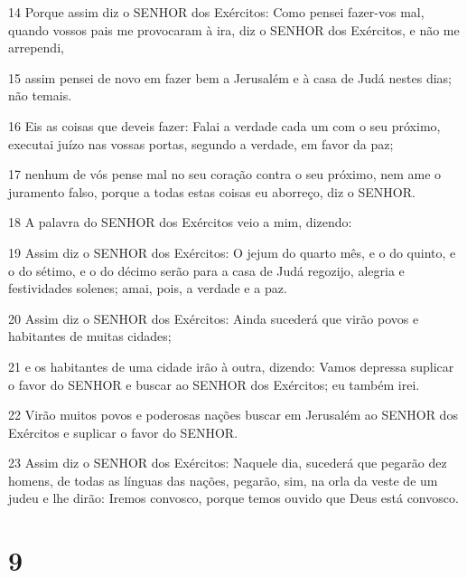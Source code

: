 \par 14 Porque assim diz o SENHOR dos Exércitos: Como pensei fazer-vos mal, quando vossos pais me provocaram à ira, diz o SENHOR dos Exércitos, e não me arrependi,
\par 15 assim pensei de novo em fazer bem a Jerusalém e à casa de Judá nestes dias; não temais.
\par 16 Eis as coisas que deveis fazer: Falai a verdade cada um com o seu próximo, executai juízo nas vossas portas, segundo a verdade, em favor da paz;
\par 17 nenhum de vós pense mal no seu coração contra o seu próximo, nem ame o juramento falso, porque a todas estas coisas eu aborreço, diz o SENHOR.
\par 18 A palavra do SENHOR dos Exércitos veio a mim, dizendo:
\par 19 Assim diz o SENHOR dos Exércitos: O jejum do quarto mês, e o do quinto, e o do sétimo, e o do décimo serão para a casa de Judá regozijo, alegria e festividades solenes; amai, pois, a verdade e a paz.
\par 20 Assim diz o SENHOR dos Exércitos: Ainda sucederá que virão povos e habitantes de muitas cidades;
\par 21 e os habitantes de uma cidade irão à outra, dizendo: Vamos depressa suplicar o favor do SENHOR e buscar ao SENHOR dos Exércitos; eu também irei.
\par 22 Virão muitos povos e poderosas nações buscar em Jerusalém ao SENHOR dos Exércitos e suplicar o favor do SENHOR.
\par 23 Assim diz o SENHOR dos Exércitos: Naquele dia, sucederá que pegarão dez homens, de todas as línguas das nações, pegarão, sim, na orla da veste de um judeu e lhe dirão: Iremos convosco, porque temos ouvido que Deus está convosco.

\chapter{9}

